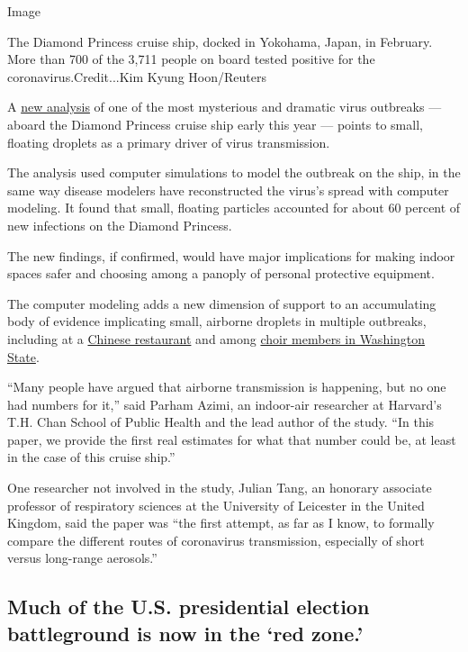 Image

The Diamond Princess cruise ship, docked in Yokohama, Japan, in
February. More than 700 of the 3,711 people on board tested positive for
the coronavirus.Credit...Kim Kyung Hoon/Reuters

A
\href{https://www.medrxiv.org/content/10.1101/2020.07.13.20153049v1}{new
analysis} of one of the most mysterious and dramatic virus outbreaks ---
aboard the Diamond Princess cruise ship early this year --- points to
small, floating droplets as a primary driver of virus transmission.

The analysis used computer simulations to model the outbreak on the
ship, in the same way disease modelers have reconstructed the virus's
spread with computer modeling. It found that small, floating particles
accounted for about 60 percent of new infections on the Diamond
Princess.

The new findings, if confirmed, would have major implications for making
indoor spaces safer and choosing among a panoply of personal protective
equipment.

The computer modeling adds a new dimension of support to an accumulating
body of evidence implicating small, airborne droplets in multiple
outbreaks, including at a
\href{https://www.nytimes3xbfgragh.onion/2020/04/20/health/airflow-coronavirus-restaurants.html}{Chinese
restaurant} and among
\href{https://www.medrxiv.org/content/10.1101/2020.06.15.20132027v2}{choir
members in Washington State}.

``Many people have argued that airborne transmission is happening, but
no one had numbers for it,'' said Parham Azimi, an indoor-air researcher
at Harvard's T.H. Chan School of Public Health and the lead author of
the study. ``In this paper, we provide the first real estimates for what
that number could be, at least in the case of this cruise ship.''

One researcher not involved in the study, Julian Tang, an honorary
associate professor of respiratory sciences at the University of
Leicester in the United Kingdom, said the paper was ``the first attempt,
as far as I know, to formally compare the different routes of
coronavirus transmission, especially of short versus long-range
aerosols.''

\hypertarget{much-of-the-us-presidential-election-battleground-is-now-in-the-red-zone}{%
\subsection{Much of the U.S. presidential election battleground is now
in the `red
zone.'}\label{much-of-the-us-presidential-election-battleground-is-now-in-the-red-zone}}

